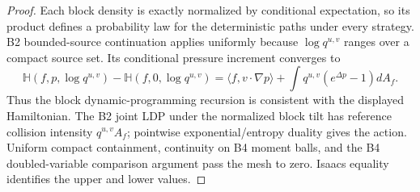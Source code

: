 \begin{proof}
Each block density is exactly normalized by conditional expectation, so its
product defines a probability law for the deterministic paths under every
strategy.  B2 bounded-source continuation applies uniformly because
\(\log q^{u,v}\) ranges over a compact source set.  Its conditional pressure
increment converges to
\[
 \mathbb H(f,p,\log q^{u,v})-
 \mathbb H(f,0,\log q^{u,v})
 =\langle f,v\cdot\nabla p\rangle
 +\int q^{u,v}(e^{\Delta p}-1)dA_f.
\]
Thus the block dynamic-programming recursion is consistent with the displayed
Hamiltonian.  The B2 joint LDP under the normalized block tilt has reference
collision intensity \(q^{u,v}A_f\); pointwise exponential/entropy duality
gives the action.  Uniform compact containment, continuity on B4 moment
balls, and the B4 doubled-variable comparison argument pass the mesh to zero.
Isaacs equality identifies the upper and lower values.
\end{proof}
